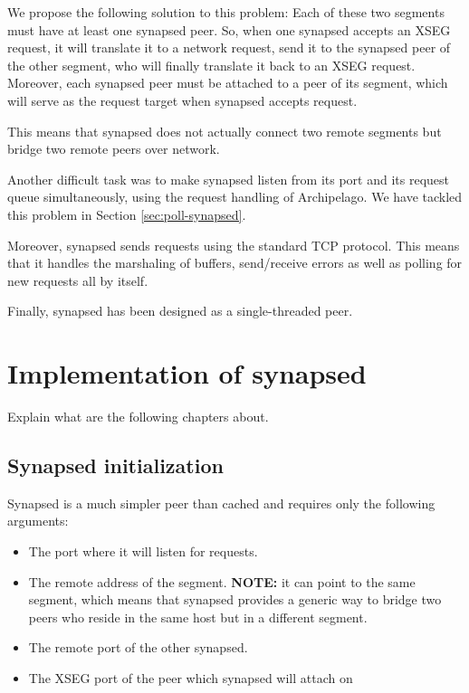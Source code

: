 We propose the following solution to this problem: Each of these two segments 
must have at least one synapsed peer. So, when one synapsed accepts an XSEG 
request, it will translate it to a network request, send it to the synapsed 
peer of the other segment, who will finally translate it back to an XSEG 
request.  Moreover, each synapsed peer must be attached to a peer of its 
segment, which will serve as the request target when synapsed accepts request.  

This means that synapsed does not actually connect two remote segments
but bridge two remote peers over network.

Another difficult task was to make synapsed listen from its port and its 
request queue simultaneously, using the request handling of Archipelago. We 
have tackled this problem in Section \ref{sec:poll-synapsed}.

Moreover, synapsed sends requests using the standard TCP protocol.  This means 
that it handles the marshaling of buffers, send/receive errors as well as 
polling for new requests all by itself.

Finally, synapsed has been designed as a single-threaded peer.

\section{Implementation of synapsed}

\todo Explain what are the following chapters about.

\subsection{Synapsed initialization}

Synapsed is a much simpler peer than cached and requires only the following 
arguments:

\begin{itemize}
	\item The port where it will listen for requests.
	\item The remote address of the segment. \textbf{NOTE:} it can point to 
		the same segment, which means that synapsed provides a generic 
		way to bridge two peers who reside in the same host but in a 
		different segment.
	\item The remote port of the other synapsed.
	\item The XSEG port of the peer which synapsed will attach on
\end{itemize}

